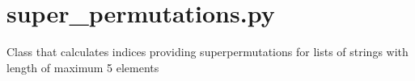 \documentclass[letterpaper,10pt,english]{sphinxmanual}
\begin{document}
\sphinxstepscope


\chapter{super\_permutations.py}
\label{\detokenize{super_permutations:module-super_permutations}}\label{\detokenize{super_permutations:super-permutations-py}}\label{\detokenize{super_permutations::doc}}
\sphinxAtStartPar
Class that calculates indices providing superpermutations for lists of strings with length of maximum 5 elements
\end{document}
